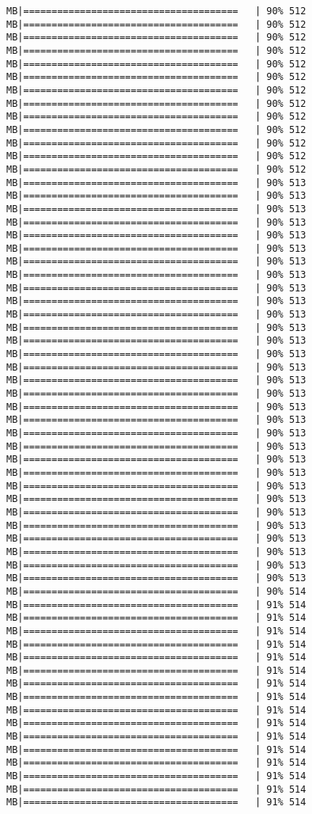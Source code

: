 \documentclass[
]{article}
\begin{document}
\begin{verbatim}
MB|======================================   | 90% 512 MB|======================================   | 90% 512 MB|======================================   | 90% 512 MB|======================================   | 90% 512 MB|======================================   | 90% 512 MB|======================================   | 90% 512 MB|======================================   | 90% 512 MB|======================================   | 90% 512 MB|======================================   | 90% 512 MB|======================================   | 90% 512 MB|======================================   | 90% 512 MB|======================================   | 90% 512 MB|======================================   | 90% 512 MB|======================================   | 90% 513 MB|======================================   | 90% 513 MB|======================================   | 90% 513 MB|======================================   | 90% 513 MB|======================================   | 90% 513 MB|======================================   | 90% 513 MB|======================================   | 90% 513 MB|======================================   | 90% 513 MB|======================================   | 90% 513 MB|======================================   | 90% 513 MB|======================================   | 90% 513 MB|======================================   | 90% 513 MB|======================================   | 90% 513 MB|======================================   | 90% 513 MB|======================================   | 90% 513 MB|======================================   | 90% 513 MB|======================================   | 90% 513 MB|======================================   | 90% 513 MB|======================================   | 90% 513 MB|======================================   | 90% 513 MB|======================================   | 90% 513 MB|======================================   | 90% 513 MB|======================================   | 90% 513 MB|======================================   | 90% 513 MB|======================================   | 90% 513 MB|======================================   | 90% 513 MB|======================================   | 90% 513 MB|======================================   | 90% 513 MB|======================================   | 90% 513 MB|======================================   | 90% 513 MB|======================================   | 90% 513 MB|======================================   | 90% 514 MB|======================================   | 91% 514 MB|======================================   | 91% 514 MB|======================================   | 91% 514 MB|======================================   | 91% 514 MB|======================================   | 91% 514 MB|======================================   | 91% 514 MB|======================================   | 91% 514 MB|======================================   | 91% 514 MB|======================================   | 91% 514 MB|======================================   | 91% 514 MB|======================================   | 91% 514 MB|======================================   | 91% 514 MB|======================================   | 91% 514 MB|======================================   | 91% 514 MB|======================================   | 91% 514 MB|======================================   | 91% 514 
\end{verbatim}
\end{document}
